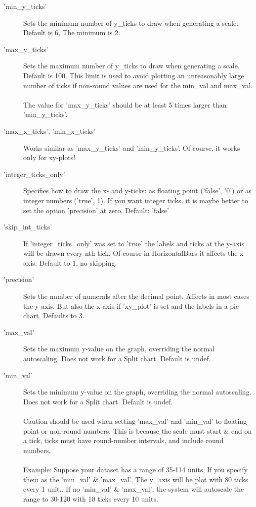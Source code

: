 \begin{description}
\item['min\_y\_ticks']Sets the minimum number of y\_ticks to draw when generating a scale. Default is 6, The minimum is 2.
\item['max\_y\_ticks']Sets the maximum number of y\_ticks to draw when generating a scale. Default is 100. This limit is used to avoid plotting an unreasonably large number of ticks if non-round values are used for the min\_val and max\_val.\\
\\
The value for 'max\_y\_ticks' should be at least 5 times larger than 'min\_y\_ticks'.
\item['max\_x\_ticks', 'min\_x\_ticks'] Works similar as 'max\_y\_ticks' and 'min\_y\_ticks'. Of course, it works only for xy-plots! 
\item['integer\_ticks\_only']Specifies how to draw the x- and y-ticks: as floating point ('false', '0') or as integer numbers ('true', 1). If you want integer ticks, it is maybe better to set the option 'precision' at zero. Default: 'false'
\item['skip\_int\_ticks']If 'integer\_ticks\_only' was set to 'true' the labels and ticks at the y-axis will be drawn every nth tick. Of course in HorizontalBars it affects the x-axis. Default to 1, no skipping.
\item['precision'] Sets the number of numerals after the decimal point. Affects in most cases the y-axis. But also the x-axis if 'xy\_plot' is set and the labels in a pie chart. Defaults to 3.
\item['max\_val']Sets the maximum y-value on the graph, overriding the normal autoscaling.  Does not work for a Split chart. Default is undef.
\item['min\_val']Sets the minimum y-value on the graph, overriding the normal autoscaling.  Does not work for a Split chart. Default is undef.\\
\\
Caution should be used when setting 'max\_val' and 'min\_val' to floating point or non-round numbers. This is because the scale must start \& end on a tick, ticks must have round-number intervals, and include round numbers.\\
\\
Example: Suppose your dataset has a range of 35-114 units, If you specify them as the 'min\_val' \& 'max\_val', The y\_axis will be plot with 80 ticks every 1 unit.. If no 'min\_val' \& 'max\_val', the system will autoscale the range to 30-120 with 10 ticks every 10 units.\\

\end{description}
